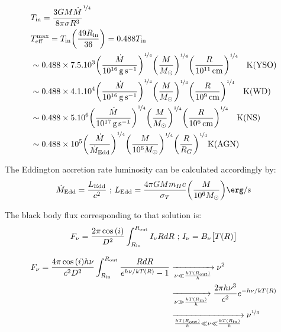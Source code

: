 \documentclass[10pt,a4paper,english]{article}
\let\originalleft\left
\let\originalright\right
\renewcommand{\left}{\mathopen{}\mathclose\bgroup\originalleft}
\renewcommand{\right}{\aftergroup\egroup\originalright}
\begin{document}
\begin{align}
    & T_\mathrm{in} = \frac{3GM\dot{M}}{8\pi\sigma R^3}^{\nicefrac{1}{4}} \\
    & T^\mathrm{max}_\mathrm{eff} = T_\mathrm{in} \left(\frac{49 R_\mathrm{in}}{36}\right) = 0.488T_\mathrm{in} \\
    & \sim 0.488\times7.5.10^3 \left( \frac{\dot{M}}{\SI{e16}{\gram \per \s}}\right)^{\nicefrac{1}{4}}
    \left( \frac{M}{M_{\odot}}\right)^{\nicefrac{1}{4}}
    \left(  \frac{R}{\SI{e11}{\cm}}\right)^{\nicefrac{1}{4}} \quad \text{K(YSO)}     \\
    & \sim 0.488\times 4.1.10^4 \left( \frac{\dot{M}}{\SI{e16}{\gram \per \s}}\right)^{\nicefrac{1}{4}}
    \left( \frac{M}{M_{\odot}}\right)^{\nicefrac{1}{4}}
    \left(  \frac{R}{\SI{e9}{\cm}}\right)^{\nicefrac{1}{4}} \quad \text{K(WD)}     \\
    & \sim 0.488\times 5.10^6  \left( \frac{\dot{M}}{\SI{e17}{\gram \per \s}}\right)^{\nicefrac{1}{4}}
    \left( \frac{M}{M_{\odot}}\right)^{\nicefrac{1}{4}}
    \left(  \frac{R}{\SI{e6}{\cm}}\right)^{\nicefrac{1}{4}} \quad \text{K(NS)}     \\
    &\sim 0.488 \times 10^5 \left(  \frac{\dot{M}}{\dot{M}_\mathrm{Edd}}\right)^{\nicefrac{1}{4}}
    \left( \frac{M}{10^6 M_{\odot}}\right)^{\nicefrac{1}{4}}
    \left(  \frac{R}{R_G}\right)^{\nicefrac{1}{4}} \text{K(AGN)}
\end{align}

The Eddington accretion rate luminosity can be calculated accordingly by:
\begin{equation}
    \dot{M}_\mathrm{Edd} = \frac{L_\mathrm{Edd}}{c^2} \text{ ; } L_\mathrm{Edd} = \frac{4\pi GMm_Hc}{\sigma_T}
    \left( \frac{M}{10^6M_{\odot}}\right) \si{\erg \per \s}
\end{equation}

The black body flux corresponding to that solution is:
\begin{equation}
    F_{\nu} = \frac{2\pi \cos{(i)}}{D^2} \int_{R_\mathrm{in}}^{R_\mathrm{out}} I_{\nu}RdR \text{  ;  }
    I_{\nu} = B_{\nu}\big[ T(R)\big] \\
\end{equation}

\begin{align}
    F_{\nu} = \frac{4\pi \cos{(i)}h\nu}{c^2D^2} \int_{R_\mathrm{in}}^{R_\mathrm{out}}
    \frac{RdR}{e^{h\nu/kT(R)}-1}
    &\xrightarrow[\nu \ll \frac{kT(R_\mathrm{out})}{h}]{} \nu^2  \\
    & \xrightarrow[\nu \gg \frac{kT(R_\mathrm{in})}{h}]{} \frac{2\pi h \nu^3}{c^2} e^{-h\nu/kT(R)}  \\
    & \xrightarrow[\frac{kT(R_\mathrm{out})}{h}\ll\nu \ll \frac{kT(R_\mathrm{in})}{h}]{} \nu^{\nicefrac{1}{3}}
\end{align}
\end{document}
